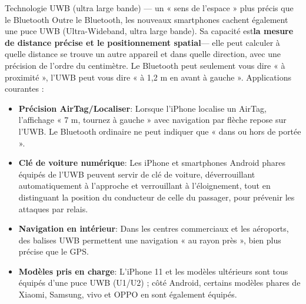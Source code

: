\begin{tcbinfo}{Technologie UWB (ultra large bande) — un « sens de l'espace » plus précis que le Bluetooth}
Outre le Bluetooth, les nouveaux smartphones cachent également une puce UWB (Ultra-Wideband, ultra large bande). Sa capacité est\textbf{la mesure de distance précise et le positionnement spatial}— elle peut calculer à quelle distance se trouve un autre appareil et dans quelle direction, avec une précision de l'ordre du centimètre. Le Bluetooth peut seulement vous dire « à proximité », l'UWB peut vous dire « à 1,2 m en avant à gauche ». Applications courantes :

\begin{itemize}
  \item \textbf{Précision AirTag/Localiser}: Lorsque l'iPhone localise un AirTag, l'affichage « 7 m, tournez à gauche » avec navigation par flèche repose sur l'UWB. Le Bluetooth ordinaire ne peut indiquer que « dans ou hors de portée ».
  \item \textbf{Clé de voiture numérique}: Les iPhone et smartphones Android phares équipés de l'UWB peuvent servir de clé de voiture, déverrouillant automatiquement à l'approche et verrouillant à l'éloignement, tout en distinguant la position du conducteur de celle du passager, pour prévenir les attaques par relais.
  \item \textbf{Navigation en intérieur}: Dans les centres commerciaux et les aéroports, des balises UWB permettent une navigation « au rayon près », bien plus précise que le GPS.
  \item \textbf{Modèles pris en charge}: L'iPhone 11 et les modèles ultérieurs sont tous équipés d'une puce UWB (U1/U2) ; côté Android, certains modèles phares de Xiaomi, Samsung, vivo et OPPO en sont également équipés.
\end{itemize}

\end{tcbinfo}

